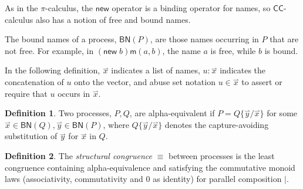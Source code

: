 \documentclass[submission,copyright,creativecommons]{eptcs}
\newcommand{\new}{\mathsf{new}}
\newcommand{\pic}{$\pi$-calculus}
\newcommand{\ccomb}{$\mathsf{CC}$-calculus}
\newcommand{\pzero}{\mathbin{0}}
\newcommand{\freenames}[1]{\mathbin{\mathsf{FN}(#1)}}
\newcommand{\boundnames}[1]{\mathbin{\mathsf{BN}(#1)}}
\newcommand{\vect}[1]{\stackrel{\rightharpoonup}{#1}}
\theoremstyle{definition}
\newtheorem{definition}{Definition}
\theoremstyle{remark}
\theoremstyle{remark}
\begin{document}
As in the {\pic}, the $\new$ operator is a binding operator
for names, so {\ccomb} also has a notion of free and bound names.


The bound names of a process, $\boundnames{P}$, are those names occurring in $P$
that are not free. For example, in $(\new\; b)\mathsf{m}(a,b)$, the name $a$ is free, while $b$ is bound.

In the following definition, $\vect{x}$ indicates a list of names,
$u:\vect{x}$ indicates the concatenation of $u$ onto the vector, and
abuse set notation $u \in \vect{x}$ to assert or require that $u$
occurs in $\vect{x}$.

\begin{definition}
Two processes, $P,Q$, are alpha-equivalent if $P = Q\{\vect{y}/\vect{x}\}$ for
some $\vect{x} \in \boundnames{Q},\vect{y} \in \boundnames{P}$, where $Q\{\vect{y}/\vect{x}\}$
denotes the capture-avoiding substitution of $\vect{y}$ for $\vect{x}$ in $Q$.
\end{definition}

\begin{definition}
  The {\em structural congruence} $\equiv$
  between processes \cite{SangiorgiWalker} is the least congruence containing
  alpha-equivalence and satisfying the commutative monoid laws
  (associativity, commutativity and $\pzero$ as identity) for parallel
  composition $|$.
\end{definition}
\end{document}
